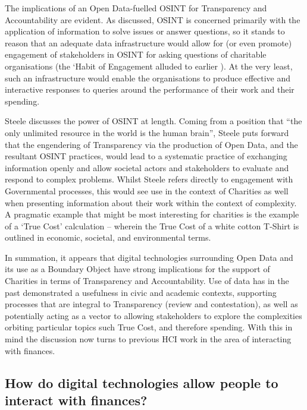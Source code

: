 The implications of an Open Data-fuelled OSINT for Transparency and Accountability are evident. As discussed, OSINT is concerned primarily with the application of information to solve issues or answer questions, so it stands to reason that an adequate data infrastructure would allow for (or even promote) engagement of stakeholders in OSINT for asking questions of charitable organisations (the `Habit of Engagement alluded to earlier \cite{gordon_making_2013-1}). At the very least, such an infrastructure would enable the organisations to produce effective and interactive responses to queries around the performance of their work and their spending. 

Steele discusses the power of OSINT at length. Coming from a position that ``the only unlimited resource in the world is the human brain'', Steele puts forward that the engendering of Transparency via the production of Open Data, and the resultant OSINT practices, would lead to a systematic practice of exchanging information openly and allow societal actors and stakeholders to evaluate and respond to complex problems. Whilst Steele refers directly to engagement with Governmental processes, this would see use in the context of Charities as well when presenting information about their work within the context of complexity. A pragmatic example that might be most interesting for charities is the example of a `True Cost' calculation --  wherein the True Cost of a white cotton T-Shirt is outlined in economic, societal, and environmental terms.

In summation, it appears that digital technologies surrounding Open Data and its use as a Boundary Object have strong implications for the support of Charities in terms of Transparency and Accountability. Use of data has in the past demonstrated a usefulness in civic and academic contexts, supporting processes that are integral to Transparency (review and contestation), as well as potentially acting as a vector to allowing stakeholders to explore the complexities orbiting particular topics such True Cost, and therefore spending. With this in mind the discussion now turns to previous HCI work in the area of interacting with finances.


\subsection{How do digital technologies allow people to interact with finances?}%

